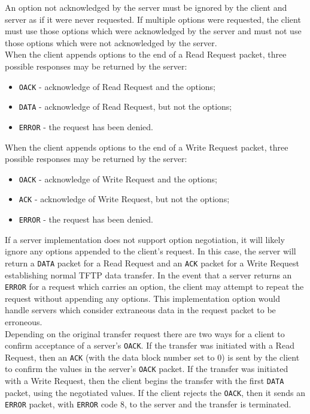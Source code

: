 \documentclass[12pt]{article}
\begin{document}
An option not acknowledged by the server must be ignored by the client and server as if it were never requested. If multiple options were requested, the client must use those options which were acknowledged by the server and must not use those options which were not acknowledged by the server.\\

When the client appends options to the end of a Read Request packet, three possible responses may be returned by the server:
\begin{itemize}
\item \verb|OACK| - acknowledge of Read Request and the options;
\item \verb|DATA| - acknowledge of Read Request, but not the options;
\item \verb|ERROR| - the request has been denied.
\end{itemize}

When the client appends options to the end of a Write Request packet, three possible responses may be returned by the server:
\begin{itemize}
\item \verb|OACK| - acknowledge of Write Request and the options;
\item \verb|ACK|  - acknowledge of Write Request, but not the options;
\item \verb|ERROR| - the request has been denied.
\end{itemize}

If a server implementation does not support option negotiation, it will likely ignore any options appended to the client's request. In this case, the server will return a \verb|DATA| packet for a Read Request and an \verb|ACK| packet for a Write Request establishing normal TFTP data transfer. In the event that a server returns an  \verb|ERROR| for a request which carries an option, the client may attempt to repeat the request without appending any options. This implementation option would handle servers which consider extraneous data in the request packet to be erroneous.\\

Depending on the original transfer request there are two ways for a client to confirm acceptance of a server's \verb|OACK|. If the transfer was initiated with a Read Request, then an \verb|ACK| (with the data block number set to 0) is sent by the client to confirm the values in the server's \verb|OACK| packet. If the transfer was initiated with a Write Request, then the client begins the transfer with the first \verb|DATA| packet, using the negotiated values. If the client rejects the \verb|OACK|, then it sends an  \verb|ERROR| packet, with  \verb|ERROR| code 8, to the server and the transfer is terminated.\\
\end{document}
